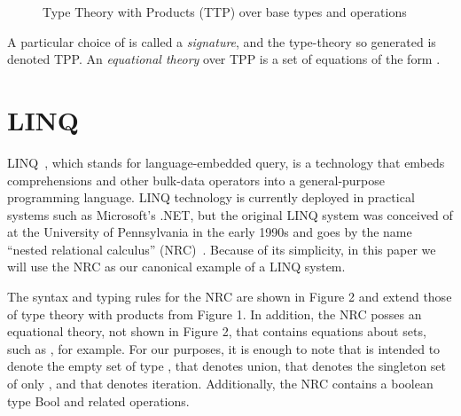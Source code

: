 \documentclass[11pt]{article}
\def\to{\rightarrow}
\theoremstyle{remark}
\theoremstyle{definition}
\begin{document}
\begin{figure}[h]
\caption{Type Theory with Products (TTP) over base types  and operations }

\irule{}{E_2 : T_1 \to T_2 \in \mathcal{E} \\ \Gamma \vdash E_1 : T_1 }{\Gamma \vdash E_2(E_1) : T_2}


\end{figure}

A particular choice of  is called a {\it signature}, and the type-theory so generated is denoted TPP.  An {\it equational theory} over TPP is a set of equations of the form .

\section{LINQ}

LINQ~\cite{Tannen:1992:NEQ:645500.655920}, which stands for language-embedded query, is a technology that embeds comprehensions and other bulk-data operators into a general-purpose programming language.  LINQ technology is currently deployed in practical systems such as Microsoft's .NET, but the original LINQ system was conceived of at the University of Pennsylvania in the early 1990s and goes by the name ``nested relational calculus'' (NRC)~\cite{921235}.  Because of its simplicity, in this paper we will use the NRC as our canonical example of a LINQ system.  

The syntax and typing rules for the NRC are shown in Figure 2 and extend those of type theory with products from Figure 1.  In addition, the NRC posses an equational theory, not shown in Figure 2, that contains equations about sets, such as , for example.  For our purposes, it is enough to note that  is intended to denote the empty set of type , that  denotes union, that  denotes the singleton set of only , and that  denotes iteration.  Additionally, the NRC contains a boolean type {\sf Bool} and related operations.
\end{document}
